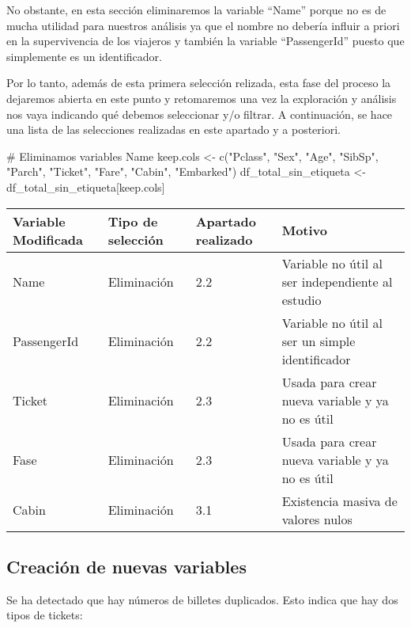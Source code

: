 \documentclass[
]{article}
\newenvironment{Shaded}{\begin{snugshade}}{\end{snugshade}}
\newcommand{\CommentTok}[1]{\textcolor[rgb]{0.50,0.62,0.50}{#1}}
\newcommand{\KeywordTok}[1]{\textcolor[rgb]{0.94,0.87,0.69}{#1}}
\newcommand{\NormalTok}[1]{\textcolor[rgb]{0.80,0.80,0.80}{#1}}
\newcommand{\StringTok}[1]{\textcolor[rgb]{0.80,0.58,0.58}{#1}}
\begin{document}
No obstante, en esta sección eliminaremos la variable ``Name'' porque no
es de mucha utilidad para nuestros análisis ya que el nombre no debería
influir a priori en la supervivencia de los viajeros y también la
variable ``PassengerId'' puesto que simplemente es un identificador.

Por lo tanto, además de esta primera selección relizada, esta fase del
proceso la dejaremos abierta en este punto y retomaremos una vez la
exploración y análisis nos vaya indicando qué debemos seleccionar y/o
filtrar. A continuación, se hace una lista de las selecciones realizadas
en este apartado y a posteriori.

\begin{Shaded}
\begin{Highlighting}[]
\CommentTok{# Eliminamos variables Name}
\NormalTok{keep.cols <-}\StringTok{ }\KeywordTok{c}\NormalTok{(}\StringTok{"Pclass"}\NormalTok{, }\StringTok{"Sex"}\NormalTok{, }\StringTok{"Age"}\NormalTok{, }\StringTok{"SibSp"}\NormalTok{, }\StringTok{"Parch"}\NormalTok{, }\StringTok{"Ticket"}\NormalTok{, }\StringTok{"Fare"}\NormalTok{, }\StringTok{"Cabin"}\NormalTok{, }\StringTok{"Embarked"}\NormalTok{)}
\NormalTok{df_total_sin_etiqueta <-}\StringTok{ }\NormalTok{df_total_sin_etiqueta[keep.cols]}
\end{Highlighting}
\end{Shaded}

\begin{longtable}[]{@{}llll@{}}
\toprule
Variable Modificada & Tipo de selección & Apartado realizado &
Motivo\tabularnewline
\midrule
\endhead
Name & Eliminación & 2.2 & Variable no útil al ser independiente al
estudio\tabularnewline
PassengerId & Eliminación & 2.2 & Variable no útil al ser un simple
identificador\tabularnewline
Ticket & Eliminación & 2.3 & Usada para crear nueva variable y ya no es
útil\tabularnewline
Fase & Eliminación & 2.3 & Usada para crear nueva variable y ya no es
útil\tabularnewline
Cabin & Eliminación & 3.1 & Existencia masiva de valores
nulos\tabularnewline
\bottomrule
\end{longtable}

\hypertarget{creaciuxf3n-de-nuevas-variables}{%
\subsection{\texorpdfstring{\textbf{Creación de nuevas
variables}}{Creación de nuevas variables}}\label{creaciuxf3n-de-nuevas-variables}}

Se ha detectado que hay números de billetes duplicados. Esto indica que
hay dos tipos de tickets:
\end{document}
